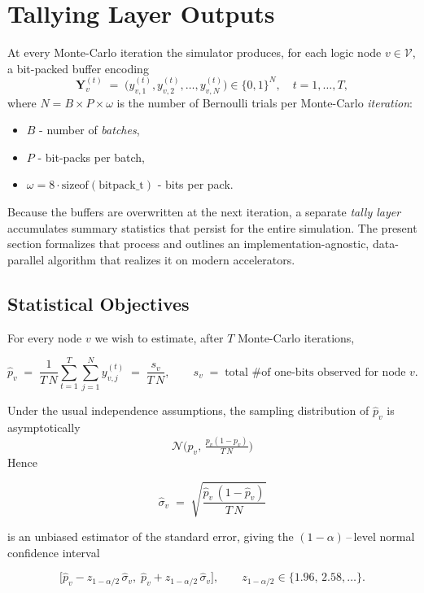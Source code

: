 \section{Tallying Layer Outputs}
\label{sec:tally_kernel}

At every Monte-Carlo iteration the simulator produces, for each logic node
\(v\in \mathcal{V}\), a bit-packed buffer encoding
\[
  \mathbf{Y}_v^{(t)}
  \;=\;
  \bigl(y_{v,1}^{(t)}, y_{v,2}^{(t)},\dots, y_{v,N}^{(t)}\bigr)
  \in\{0,1\}^N,
  \quad t = 1,\dots,T,
\]
where \(N\!=\!B\!\times\!P\!\times\!\omega\) is the number of Bernoulli trials
per Monte-Carlo \emph{iteration}:
\begin{itemize}
    \item \(B\) - number of \emph{batches},
    \item \(P\) - bit-packs per batch,
    \item \(\omega\!=\!8\cdot\mathrm{sizeof}(\text{bitpack\_t})\) - bits per pack.
\end{itemize}
Because the buffers are overwritten at the next iteration, a
separate \emph{tally layer} accumulates summary statistics that persist for the
entire simulation.  The present section formalizes that process and outlines
an implementation-agnostic, data-parallel algorithm that realizes it on modern
accelerators.

\subsection{Statistical Objectives}
\label{subsec:tally_objective}

For every node \(v\) we wish to estimate, after \(T\) Monte-Carlo iterations,

\[
  \widehat{p}_v
  \;=\;
  \frac{1}{T\,N}
  \sum_{t=1}^{T}\sum_{j=1}^{N} y_{v,j}^{(t)}
  \;=\;
  \frac{s_v}{T\,N},
  \qquad
  s_v \;=\; \text{total \# of one-bits observed for node \(v\)}.
\]

Under the usual independence assumptions, the sampling distribution of
\(\widehat{p}_v\) is asymptotically
\[
\mathcal{N}\!\bigl(p_v,\,
  \tfrac{p_v(1-p_v)}{T\,N}\bigr)
\]
Hence

\[
  \widehat{\sigma}_v
  \;=\;
  \sqrt{\frac{\widehat{p}_v\,(1-\widehat{p}_v)}{T\,N}}
\]

is an unbiased estimator of the standard error, giving the
\((1-\alpha)\)\,--\,level normal confidence interval

\[
  \bigl[
    \widehat{p}_v - z_{1-\alpha/2}\,\widehat{\sigma}_v,\;
    \widehat{p}_v + z_{1-\alpha/2}\,\widehat{\sigma}_v
  \bigr],
  \qquad
  z_{1-\alpha/2}\in\{1.96,\,2.58,\dots\}.
\]

